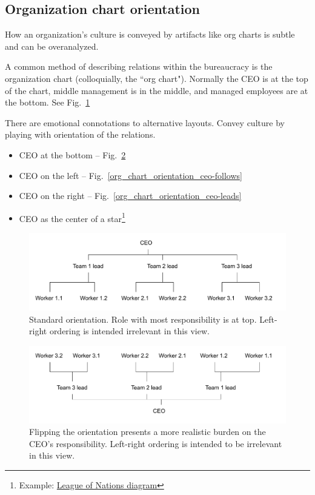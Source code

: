 \subsection{Organization chart orientation
\label{org-chart-orientation}}

How an organization's culture is conveyed by artifacts like org charts is subtle and can be overanalyzed. 

A common method of describing relations within the bureaucracy is the organization chart (colloquially, the ``org chart"). Normally the CEO is at the top of the chart, middle management is in the middle, and managed employees are at the bottom. See Fig.~\ref{org_chart_orientation_ceo-at-top} 

There are emotional connotations to alternative layouts. Convey culture by playing with orientation of the relations.

\begin{itemize}
\item CEO at the bottom -- Fig.~\ref{org_chart_orientation_ceo-at-bottom}
\item CEO on the left -- Fig.~\ref{org_chart_orientation_ceo-follows}
\item CEO on the right -- Fig.~\ref{org_chart_orientation_ceo-leads}
\item CEO as the center of a star\footnote{Example: \href{https://en.wikipedia.org/wiki/File:League_of_Nations_Organization.png}{League of Nations diagram}}
\end{itemize}


\begin{figure}
\includegraphics[width=1\textwidth]{images/org-chart-orientation-ceo-at-top.pdf}
\caption{Standard orientation. Role with most responsibility is at top. Left-right ordering is intended irrelevant in this view.}
\label{org_chart_orientation_ceo-at-top}
\end{figure}

\begin{figure}
\includegraphics[width=1\textwidth]{images/org-chart-orientation-ceo-at-bottom.pdf}
\caption{Flipping the orientation presents a more realistic burden on the CEO's responsibility. Left-right ordering is intended to be irrelevant in this view.}
\label{org_chart_orientation_ceo-at-bottom}
\end{figure}

